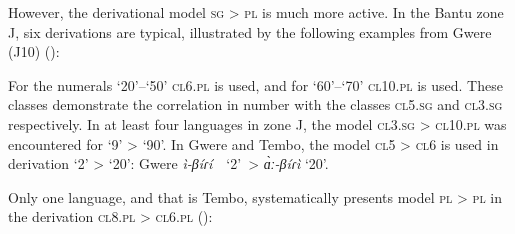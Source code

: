 However, the derivational model \textsc{sg} > \textsc{pl} is much more active. In the Bantu zone J, six derivations are typical, illustrated by the following examples from Gwere (J10) (): 


\begin{table}
\caption{\label{tab:1:23} Gwere number patterns in the derivations of numerals}

\end{table}


For the numerals ‘20’–‘50’ \textsc{cl}6.\textsc{pl} is used, and for ‘60’–‘70’ \textsc{cl}10.\textsc{pl} is used. These classes demonstrate the correlation in number with the classes \textsc{cl}5.\textsc{sg} and \textsc{cl}3.\textsc{sg} respectively. In at least four languages in zone J, the model \textsc{cl}3.\textsc{sg} > \textsc{cl}10.\textsc{pl} was encountered for ‘9’ > ‘90’. In Gwere and Tembo, the model \textsc{cl}5 > \textsc{cl}6 is used in derivation ‘2’ > ‘20’: Gwere \textit{ì-β}\textit{{\'{i}}ɾ{\'{i}}}~~‘2’~>  \textit{{\`{ɑ}}ː-β}\textit{{\'{i}}ɾì} ‘20’. 

Only one language, and that is Tembo, systematically presents model \textsc{pl} > \textsc{pl} in the derivation \textsc{cl}8.\textsc{pl}  > \textsc{cl}6.\textsc{pl} ():


